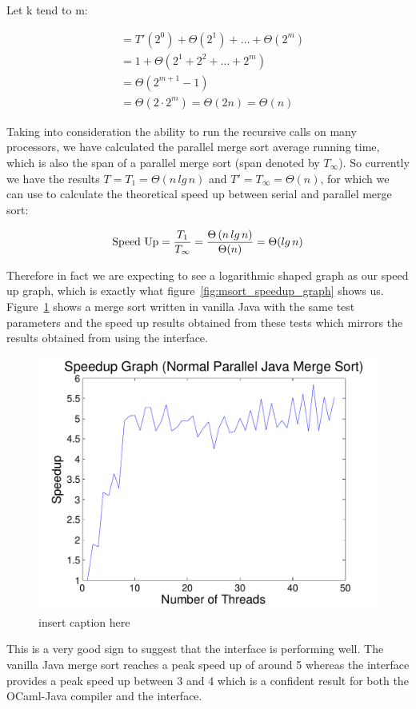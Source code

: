\documentclass[12pt,twoside,notitlepage]{report}
\begin{document}
Let k tend to m:

\begin{align*}
&= T'\left(2^{0}\right) + \Theta\left(2^{1}\right) + \ldots + \Theta\left(2^{m}\right) \\
&= 1 + \Theta\left(2^{1} + 2^{2} + \ldots + 2^{m}\right) \\
&= \Theta\left(2^{m+1} - 1\right) \\
&= \Theta\left(2\cdot2^{m}\right)
= \Theta\left(2n\right)
= \Theta\left(n\right)
\end{align*}

Taking into consideration the ability to run the recursive calls on many processors, we have calculated the parallel merge sort average running time, which is also the span of a parallel merge sort (span denoted by $T_\infty$). So
currently we have the results $T = T_{1} = \Theta(n\,lg\,n)$ and $T' = T_{\infty} = \Theta(n)$, for which we can use to calculate the theoretical speed up between serial and parallel merge sort:

\begin{align*}
\text{Speed Up} = {T_{1} \over T_{\infty}} = {\Theta\left(n\,lg\,n\right) \over \Theta(n)} = \Theta(lg\,n)
\end{align*}

Therefore in fact we are expecting to see a logarithmic shaped graph as our speed up graph, which is exactly what figure~\ref{fig:msort_speedup_graph} shows us. Figure~\ref{fig:java_speedup_graph} shows a merge sort written in vanilla Java with the same test parameters and the speed up results obtained from these tests which mirrors the results obtained from using the interface.
\begin{figure}[h!]
\includegraphics[width=\linewidth]{java_speedup_graph}
\caption{insert caption here}
\label{fig:java_speedup_graph}
\end{figure}
This is a very good sign to suggest that the interface is performing well. The vanilla Java merge sort reaches a peak speed up of around 5 whereas the interface provides a peak speed up between 3 and 4 which is a confident result for
both the OCaml-Java compiler and the interface. 
\end{document}
